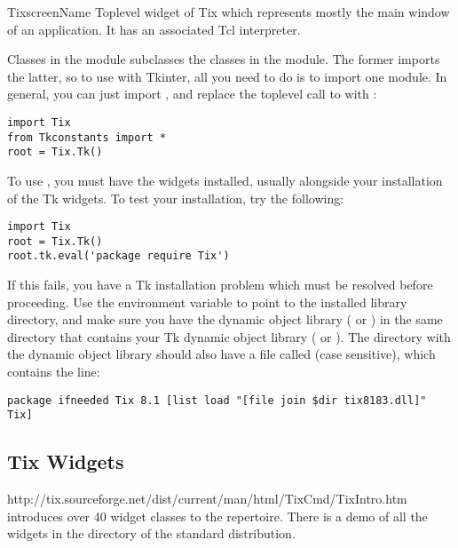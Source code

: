 \begin{classdesc}{Tix}{screenName}
    Toplevel widget of Tix which represents mostly the main window
    of an application. It has an associated Tcl interpreter.

Classes in the  module subclasses the classes in the
 module. The former imports the latter, so to use
 with Tkinter, all you need to do is to import one
module. In general, you can just import , and replace
the toplevel call to  with :
\begin{verbatim}
import Tix
from Tkconstants import *
root = Tix.Tk()
\end{verbatim}
\end{classdesc}

To use , you must have the  widgets installed,
usually alongside your installation of the Tk widgets.
To test your installation, try the following:
\begin{verbatim}
import Tix
root = Tix.Tk()
root.tk.eval('package require Tix')
\end{verbatim}

If this fails, you have a Tk installation problem which must be
resolved before proceeding. Use the environment variable 
to point to the installed  library directory, and
make sure you have the dynamic object library ( or
) in  the same directory that contains your Tk
dynamic object library ( or ). The
directory with the dynamic object library should also have a file
called  (case sensitive), which contains the line:

\begin{verbatim}
package ifneeded Tix 8.1 [list load "[file join $dir tix8183.dll]" Tix]
\end{verbatim} %


\subsection{Tix Widgets}

{http://tix.sourceforge.net/dist/current/man/html/TixCmd/TixIntro.htm}
introduces over 40 widget classes to the  
repertoire.  There is a demo of all the  widgets in the
 directory of the standard distribution.


